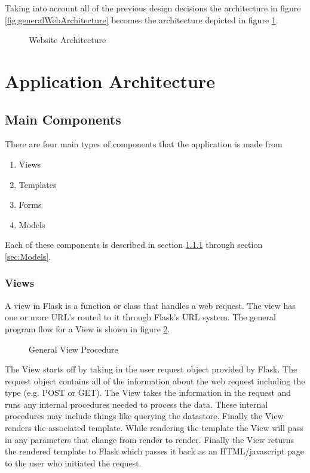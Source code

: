 \documentclass{article}
\begin{document}
Taking into account all of the previous design decisions the architecture in figure \ref{fig:generalWebArchitecture}
becomes the architecture depicted in figure \ref{fig:finalWebArchitecture}.

\FloatBarrier
\begin{figure}[h!]

\caption{Website Architecture}
\label{fig:finalWebArchitecture}
\end{figure}
\FloatBarrier

\section{Application Architecture}

\subsection{Main Components}

There are four main types of components that the application is made from

\begin{enumerate}
\item Views
\item Templates
\item Forms
\item Models
\end{enumerate}

Each of these components is described in section \ref{sec:Views} through section \ref{sec:Models}.

\subsubsection{Views}
\label{sec:Views}

A view in Flask is a function or class that handles a web request. The view has one or more URL's routed to it through Flask's URL system. The general program flow for a View is shown in figure \ref{fig:ViewProgramFlow}.

\FloatBarrier
\begin{figure}[h!]
\caption{General View Procedure}
\label{fig:ViewProgramFlow}
\end{figure}
\FloatBarrier

The View starts off by taking in the user request object provided by Flask. The request object contains all of the information
about the web request including the type (e.g. POST or GET). The View takes the information in the request and runs 
any internal procedures needed to process the data. These internal procedures may include things like querying the datastore. Finally the View renders the associated template. While rendering the template the View will pass in any parameters that change from render to render. Finally the View returns the rendered template to Flask which passes it back
as an HTML/javascript page to the user who initiated the request.
\end{document}
